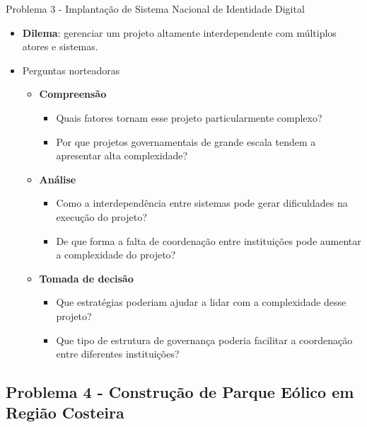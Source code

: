 \documentclass{beamer}
\begin{document}
\begin{frame}{Problema 3 - Implantação de Sistema Nacional de Identidade Digital}
	\begin{itemize}
		\justifying
		\item \textbf{Dilema}: gerenciar um projeto altamente interdependente com múltiplos atores e sistemas.
		\item Perguntas norteadoras
			\begin{itemize}
				\item \textbf{Compreensão}
					\begin{itemize}
						\justifying
						\item Quais fatores tornam esse projeto particularmente complexo?
						\item Por que projetos governamentais de grande escala tendem a apresentar alta complexidade?
					\end{itemize}
				\item \textbf{Análise}
					\begin{itemize}
						\justifying
						\item Como a interdependência entre sistemas pode gerar dificuldades na execução do projeto?
						\item De que forma a falta de coordenação entre instituições pode aumentar a complexidade do projeto?
					\end{itemize}
				\item \textbf{Tomada de decisão}
					\begin{itemize}
						\justifying
						\item Que estratégias poderiam ajudar a lidar com a complexidade desse projeto?
						\item Que tipo de estrutura de governança poderia facilitar a coordenação entre diferentes instituições?
					\end{itemize}
			\end{itemize}
	\end{itemize}
\end{frame}

\subsection{Problema 4 - Construção de Parque Eólico em Região Costeira}
\end{document}
